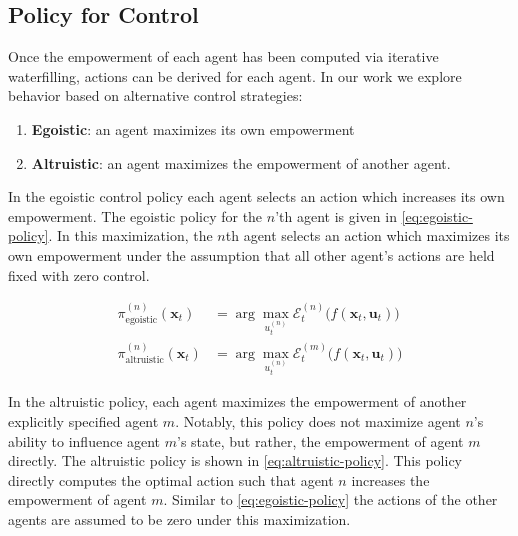 \documentclass{article} %
\begin{document}
\subsection{Policy for Control}

Once the empowerment of each agent has been computed via iterative waterfilling, actions can be derived for each agent. In our work we explore behavior based on alternative control strategies:
\begin{enumerate}
    \item \textbf{Egoistic}: an agent maximizes its own empowerment
    \item \textbf{Altruistic}: an agent maximizes the empowerment of another agent.
\end{enumerate}

In the egoistic control policy each agent selects an action which increases its own empowerment. The egoistic policy for the $n$'th agent is given in \eqref{eq:egoistic-policy}. In this maximization, the $n$th agent selects an action which maximizes its own empowerment under the assumption that all other agent's actions are held fixed with zero control.

\begin{align}
    \pi_\textrm{egoistic}^{(n)}(\mathbf{x}_t) &= \arg\max_{u_t^{(n)}} \mathcal{E}_t^{(n)}\big(f(\mathbf{x}_t, \mathbf{u}_t)\big) \label{eq:egoistic-policy}\\
    \pi_\textrm{altruistic}^{(n)}(\mathbf{x}_t) &= \arg\max_{u_t^{(n)}} \mathcal{E}_t^{(m)}\big(f(\mathbf{x}_t, \mathbf{u}_t)\big) \label{eq:altruistic-policy}
\end{align}


In the altruistic policy, each agent maximizes the empowerment of another explicitly specified agent $m$. Notably, this policy does not maximize agent $n$'s ability to influence agent $m$'s state, but rather, the empowerment of agent $m$ directly. The altruistic policy is shown in \eqref{eq:altruistic-policy}. This policy directly computes the optimal action such that agent $n$ increases the empowerment of agent $m$.
Similar to \eqref{eq:egoistic-policy} the actions of the other agents are assumed to be zero under this maximization.
\end{document}
